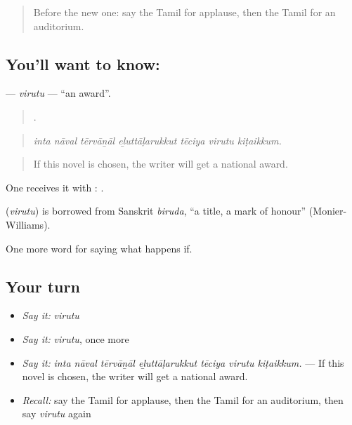 \label{lesson:TA-C555-virutu}



\begin{quote}
Before the new one: say the Tamil for applause, then the Tamil for an auditorium.
\end{quote}

\subsection*{You'll want to know: }
\textbf{} — \emph{virutu} — \textquotedblleft{}an award\textquotedblright{}.

\begin{quote}
      .
\end{quote}

\begin{quote}
\emph{inta nāval tērvāṉāl eḻuttāḷarukkut tēciya virutu kiṭaikkum.}
\end{quote}

\begin{quote}
If this novel is chosen, the writer will get a national award.
\end{quote}

One receives it with :  .

\begin{cousinweb}
\textbf{} (\emph{virutu}) is borrowed from Sanskrit \emph{biruda}, \textquotedblleft{}a title, a mark of honour\textquotedblright{} (Monier-Williams).
\end{cousinweb}

\begin{grammarlens}[title={What you've built}]
One more word for saying what happens if.
\end{grammarlens}

\subsection*{Your turn}
\begin{itemize}
\raggedright
  \item \emph{Say it:} \emph{virutu}
  \item \emph{Say it:} \emph{virutu}, once more
  \item \emph{Say it:} \emph{inta nāval tērvāṉāl eḻuttāḷarukkut tēciya virutu kiṭaikkum.} — If this novel is chosen, the writer will get a national award.
  \item \emph{Recall:} say the Tamil for applause, then the Tamil for an auditorium, then say \emph{virutu} again
\end{itemize}


